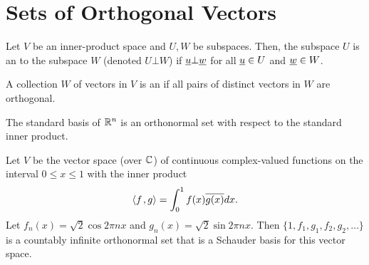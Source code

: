 \section{Sets of Orthogonal Vectors}

\begin{definition}
Let $V$ be an inner-product space and $U,W$ be subspaces.
Then, the subspace $U$ is an  to the subspace $W$ (denoted $U \bot W$) if $\underline{u} \bot \underline{w}$ for all $\underline{u}\in U$ and $\underline{w}\in W$.
\end{definition}

\begin{definition}
A collection $W$ of vectors in $V$ is an  if all pairs of distinct vectors in $W$ are orthogonal.
\end{definition}

\begin{example}
The standard basis of $\mathbb{R}^n$ is an orthonormal set with respect to the standard inner product.
\end{example}

\begin{example}
Let $V$ be the vector space (over $\mathbb{C}$) of continuous complex-valued functions on the interval $0 \leq x \leq 1$ with the inner product
\begin{equation*}
{\left\langle  f  \mskip2mu ,  g  \right\rangle} = \int_0^1 f(x) \overline{g(x)} dx.
\end{equation*}
Let $f_n(x) = \sqrt{2} \cos 2 \pi n x$ and $g_n (x) = \sqrt{2} \sin 2 \pi n x$.
Then $\{ 1, f_1, g_1, f_2, g_2, \ldots \}$ is a countably infinite orthonormal set that is a Schauder basis for this vector space.
\end{example}

